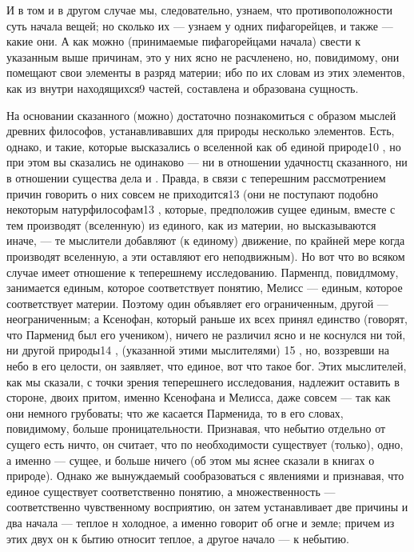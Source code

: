 \documentclass{article}
\begin{document}
{И в том и в другом случае мы, следовательно, узнаем, что противоположности суть начала вещей; но сколько их — узнаем у одних пифагорейцев, и также — какие они. А как можно (принимаемые пифагорейцами начала) свести к указанным выше причинам, это у них
\footnotemark[5]
ясно не расчленено, но, повидимому, они помещают свои элементы в разряд материи; ибо по их словам из этих элементов, как из внутри находящихся9  частей, составлена и образована сущность.

На основании сказанного (можно) достаточно познакомиться с образом мыслей древних философов, устанавливавших для природы несколько элементов. Есть, однако, и такие, которые высказались о вселенной как об единой природе10 , но при этом вы сказались не одинаково — ни в отношении удачностц сказанного, ни в отношении существа дела  и . Правда, в связи с теперешним рассмотрением причин говорить о них  совсем не приходится13  (они не поступают подобно некоторым натурфилософам13 , которые, предположив сущее единым, вместе с тем производят (вселенную) из единого, как из материи, но высказываются иначе, — те мыслители добавляют (к единому) движение, по крайней мере когда производят вселенную, а эти оставляют его неподвижным). Но вот что во всяком случае имеет отношение к теперешнему исследованию. Парменпд, повидлмому, занимается единым, которое соответствует понятию,
\footnotemark[6]
Мелисс — единым, которое соответствует материи. Поэтому один объявляет его ограниченным, другой — неограниченным; а Ксенофан, который раньше их всех принял единство (говорят, что Парменид был его учеником), ничего не различил ясно и не коснулся ни той, ни другой природы14 , (указанной этими мыслителями)  15 , но, воззревши на небо в его целости, он заявляет, что единое, вот что такое бог. Этих мыслителей, как мы сказали, с точки зрения теперешнего исследования, надлежит оставить в стороне, двоих притом, именно Ксенофана и Мелисса, даже совсем — так как они немного грубоваты; что же касается Парменида, то в его словах, повидимому, больше проницательности. Признавая, что небытио отдельно от сущего есть ничто, он считает, что по необходимости существует (только), одно, а именно — сущее, и больше ничего (об этом мы яснее сказали в книгах о природе).
\footnotemark[7]
Однако же вынуждаемый сообразоваться с явлениями и признавая, что единое существует соответственно понятию, а множественность — соответственно чувственному восприятию, он затем устанавливает две причины и два начала — теплое н холодное, а именно говорит об огне и земле; причем из этих двух он к бытию относит теплое, а другое начало — к небытию.

}
\end{document}

